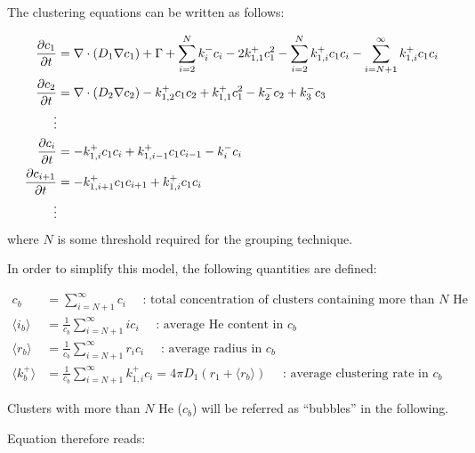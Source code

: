 The clustering equations can be written as follows:

\begin{subequations}
    \begin{align}
        \frac{\partial c_1}{\partial t} &= \nabla \cdot (D_1 \nabla c_1) + \Gamma + \sum\limits_{i=2}^N k_{i}^- c_i - 2k_{1, 1}^+ c_1^2 - \sum\limits_{i=2}^N k_{1,i}^+ c_1 c_i - \sum\limits_{i=N+1}^\infty k_{1,i}^+ c_1 c_i \\
        \frac{\partial c_2}{\partial t} &= \nabla \cdot (D_2 \nabla c_2) - k_{1, 2}^+ c_1 c_2 + k_{1, 1}^+ c_1^2 - k_{2}^- c_2 + k_{3}^- c_3\\
        \vdots \nonumber\\
        \frac{\partial c_i}{\partial t} &= - k_{1, i}^+ c_1 c_i + k_{1, i-1}^+ c_1 c_{i-1} - k_{i}^- c_i\\
        \frac{\partial c_{i+1}}{\partial t} &= - k_{1, i+1}^+ c_1 c_{i+1} + k_{1, i}^+ c_1 c_i\\
        \vdots \nonumber
    \end{align}
    \labeq{temporal evolution no grouping}
\end{subequations}
where $N$ is some threshold required for the grouping technique.

In order to simplify this model, the following quantities are defined:

\begin{align}
    c_b &= \sum\limits_{i=N+1}^\infty c_i \quad \text{ : total concentration of clusters containing more than $N$ He} \\
    \langle i_b \rangle &= \frac{1}{c_b} \sum\limits_{i=N+1}^\infty i c_i \quad \text{ : average He content in $c_b$} \\
    \langle r_b \rangle &=  \frac{1}{c_b}\sum\limits_{i=N+1}^\infty r_i c_i \quad \text{ : average radius in $c_b$}\\
    \langle k_b^+ \rangle &=  \frac{1}{c_b}\sum\limits_{i=N+1}^\infty k_{1,i}^+ c_i = 4 \pi D_1 (r_1 + \langle r_b \rangle) \quad \text{ : average clustering rate in $c_b$}
\end{align}

Clusters with more than $N$ He ($c_b$) will be referred as ``bubbles'' in the following.

Equation  therefore reads:

